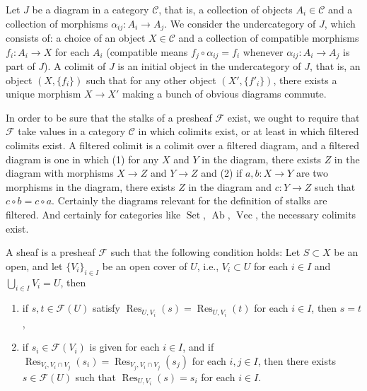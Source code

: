 \begin{definition}
Let $J$ be a diagram in a category $\mathcal C$, that is, a collection of objects
$A_i\in\mathcal C$ and a collection of morphisms $\alpha_{ij}:A_i\to A_j$. We consider the
undercategory of $J$, which consists of: a choice of an object $X\in\mathcal C$ and a collection
of compatible morphisms $f_i:A_i\to X$ for each $A_i$ (compatible means
$f_j\circ\alpha_{ij}=f_i$ whenever $\alpha_{ij}:A_i\to A_j$ is part of $J$). A colimit of $J$
is an initial object in the undercategory of $J$, that is, an object $(X,\{f_i\})$ such that
for any other object $(X',\{f'_i\})$, there exists a unique morphism $X\to X'$ making
a bunch of obvious diagrams commute.
\end{definition}

In order to be sure that the stalks of a presheaf $\mathcal F$ exist, we ought to require that $\mathcal F$ take
values in a category $\mathcal C$ in which colimits exist, or at least in which filtered colimits exist. A
filtered colimit is a colimit over a filtered diagram, and a filtered diagram is one in which (1)
for any $X$ and $Y$ in the diagram, there exists $Z$ in the diagram with morphisms $X\to Z$
and $Y\to Z$ and (2) if $a,b:X\to Y$ are two morphisms in the diagram, there exists $Z$ in
the diagram and $c:Y\to Z$ such that $c\circ b=c\circ a$. Certainly the diagrams relevant for the
definition of stalks are filtered. And certainly for categories like $\operatorname{Set}$, $\operatorname{Ab}$,
$\operatorname{Vec}$, the necessary colimits exist.

\begin{definition}
\label{definition-sheaf}
A sheaf is a presheaf $\mathcal F$ such that the following condition holds: Let
$S\subset X$ be an open, and let $\{V_i\}_{i\in I}$ be an open cover of $U$, i.e.,
$V_i\subset U$ for each $i\in I$ and $\bigcup_{i\in I}V_i=U$, then
\begin{enumerate}
\item if $s,t\in\mathcal F(U)$ satisfy
$\operatorname{Res}_{U,V_i}(s)=\operatorname{Res}_{U,V_i}(t)$ for each $i\in I$, then $s=t$,
\item if $s_i\in\mathcal F(V_i)$ is given for each $i\in I$, and if
$\operatorname{Res}_{V_i,V_i\cap V_j}(s_i)=
\operatorname{Res}_{V_j,V_i\cap V_j}(s_j)$ for each $i,j\in I$, then there exists
$s\in\mathcal F(U)$ such that $\operatorname{Res}_{U,V_i}(s)=s_i$ for each $i\in I$.
\end{enumerate}
\end{definition}

